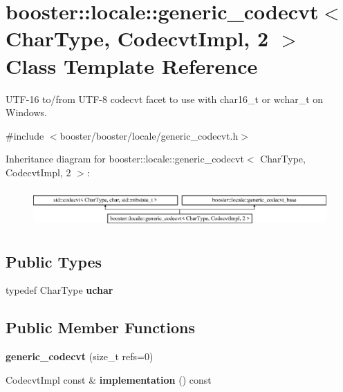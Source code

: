 \section{booster\+:\+:locale\+:\+:generic\+\_\+codecvt$<$ Char\+Type, Codecvt\+Impl, 2 $>$ Class Template Reference}
\label{classbooster_1_1locale_1_1generic__codecvt_3_01CharType_00_01CodecvtImpl_00_012_01_4}


U\+T\+F-\/16 to/from U\+T\+F-\/8 codecvt facet to use with char16\+\_\+t or wchar\+\_\+t on Windows.  




{\ttfamily \#include $<$booster/booster/locale/generic\+\_\+codecvt.\+h$>$}

Inheritance diagram for booster\+:\+:locale\+:\+:generic\+\_\+codecvt$<$ Char\+Type, Codecvt\+Impl, 2 $>$\+:\begin{figure}[H]
\begin{center}
\leavevmode
\includegraphics[height=1.485411cm]{classbooster_1_1locale_1_1generic__codecvt_3_01CharType_00_01CodecvtImpl_00_012_01_4}
\end{center}
\end{figure}
\subsection*{Public Types}
\begin{DoxyCompactItemize}
\item 
typedef Char\+Type {\bfseries uchar}\label{classbooster_1_1locale_1_1generic__codecvt_3_01CharType_00_01CodecvtImpl_00_012_01_4_a206e745dba14f5ba7f22f33eb446cd3c}

\end{DoxyCompactItemize}
\subsection*{Public Member Functions}
\begin{DoxyCompactItemize}
\item 
{\bfseries generic\+\_\+codecvt} (size\+\_\+t refs=0)\label{classbooster_1_1locale_1_1generic__codecvt_3_01CharType_00_01CodecvtImpl_00_012_01_4_a13c8a4a3b097d6d7b236d79cf084d8b5}

\item 
Codecvt\+Impl const \& {\bfseries implementation} () const \label{classbooster_1_1locale_1_1generic__codecvt_3_01CharType_00_01CodecvtImpl_00_012_01_4_ae4330c80da48da33b07ab08f3be99881}

\end{DoxyCompactItemize}
